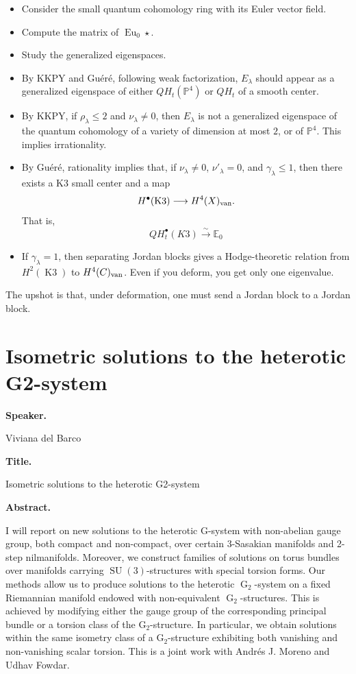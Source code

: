\begin{itemize}
\item Consider the small quantum
cohomology ring with its Euler vector
field.
\item Compute the matrix of
$\operatorname{Eu}_0\star$.
\item Study the generalized
eigenspaces.
\item By KKPY and Gu\'er\'e, following
weak factorization, $E_\lambda$
should appear as a generalized
eigenspace of either
$QH_t(\mathbb{P}^4)$ or
$QH_t$ of a smooth center.
\item By KKPY, if
$\rho_\lambda\leq 2$ and
$\nu_\lambda\neq 0$, then
$E_\lambda$ is not a generalized
eigenspace of the quantum cohomology
of a variety of dimension at most $2$,
or of $\mathbb{P}^4$.
This implies irrationality.
\item By Gu\'er\'e, rationality
implies that, if
$\nu_\lambda\neq 0$,
$\nu'_\lambda=0$, and
$\gamma_\lambda\leq 1$, then there
exists a K3 small center and a map
\[
        H^\bullet(\operatorname{K3})
        \longrightarrow H^4(X)_{\rm van}.
\]
That is,
$$
QH^\bullet_t(K3) 
\xrightarrow{\sim} 
\mathbb{E}_0
$$

\item If $\gamma_\lambda=1$, then
separating Jordan blocks gives a
Hodge-theoretic relation from
$H^2(\operatorname{K3})$ to
$H^4(C)_{\rm van}$.
Even if you deform, you get only
one eigenvalue.
\end{itemize}

The upshot is that, under deformation,
one must send a Jordan block to a
Jordan block.

\providecommand{\SU}{\operatorname{SU}}
\providecommand{\G}{\operatorname{G}}
\providecommand{\rG}{\mathrm{G}}

\section{Isometric solutions to the
heterotic G2-system}
\label{section-isometric-solutions-
heterotic-g2-system}

\medskip\noindent
{\bf Speaker.}

Viviana del Barco

\medskip\noindent
{\bf Title.}

Isometric solutions to the heterotic
G2-system

\medskip\noindent
{\bf Abstract.}

I will report on new solutions to the
heterotic G-system with non-abelian
gauge group, both compact and
non-compact, over certain 3-Sasakian
manifolds and 2-step nilmanifolds.
Moreover, we construct families of
solutions on torus bundles over
manifolds carrying $\SU(3)$-structures
with special torsion forms. Our
methods allow us to produce solutions
to the heterotic $\G_2$-system on a
fixed Riemannian manifold endowed with
non-equivalent $\G_2$-structures. This
is achieved by modifying either the
gauge group of the corresponding
principal bundle or a torsion class of
the $\rG_2$-structure. In particular,
we obtain solutions within the same
isometry class of a $\rG_2$-structure
exhibiting both vanishing and
non-vanishing scalar torsion. This is
a joint work with Andrés J. Moreno and
Udhav Fowdar.

